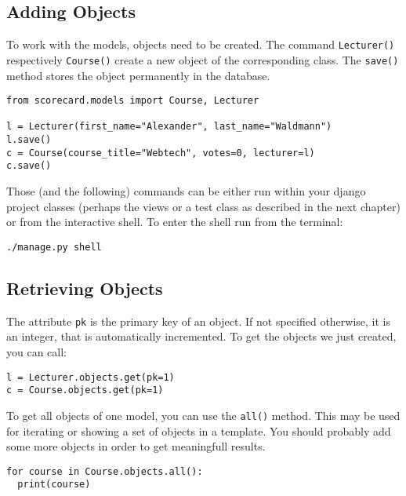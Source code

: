 \subsection{Adding Objects}

To work with the models, objects need to be created. The command \lstinline|Lecturer()| respectively \lstinline|Course()| create a new object of the corresponding class. The \lstinline|save()| method stores the object permanently in the database.
\begin{lstlisting}[style=Python, caption=Adding Objects, label=lst:adding_objects]
from scorecard.models import Course, Lecturer

l = Lecturer(first_name="Alexander", last_name="Waldmann")
l.save()
c = Course(course_title="Webtech", votes=0, lecturer=l)
c.save()
\end{lstlisting}

Those (and the following) commands can be either run within your django project classes (perhaps the views or a test class as described in the next chapter) or from the interactive shell. To enter the shell run from the terminal:
\begin{lstlisting}[style=Bash, caption=Open django shell, label=lst:django_shell]
./manage.py shell
\end{lstlisting}

\subsection{Retrieving Objects}
The attribute \lstinline|pk| is the primary key of an object. If not specified otherwise, it is an integer, that is automatically incremented. To get the objects we just created, you can call:
\begin{lstlisting}[style=Python, caption=Retrieving objects by Primary Key, label=lst:retrieving_objects_pk]
l = Lecturer.objects.get(pk=1)
c = Course.objects.get(pk=1)
\end{lstlisting}

To get all objects of one model, you can use the \lstinline|all()| method. This may be used for iterating or showing a set of objects in a template. You should probably add some more objects in order to get meaningfull results.
\begin{lstlisting}[style=Python, caption=Retrieving all objects of a model, label=lst:retrieving_objects_all]
for course in Course.objects.all():
  print(course)
\end{lstlisting}

